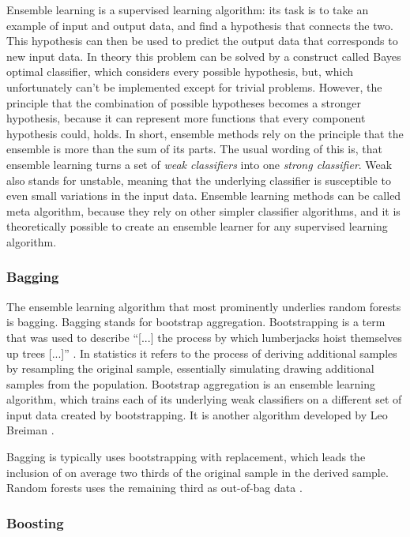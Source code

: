 \documentclass[a4paper,man,12pt,apacite]{apa6} %
\begin{document}
Ensemble learning is a supervised learning algorithm: its task is to take
an example of input and output data, and find a hypothesis that connects
the two.
This hypothesis can then be used to predict the output data that
corresponds to new input data.
In theory this problem can be solved by a construct called
Bayes optimal classifier, which considers every possible hypothesis,
but, which unfortunately can't be implemented except for trivial problems.
However, the principle that the combination of possible hypotheses becomes
a stronger hypothesis, because it can represent more functions that every
component hypothesis could, holds.
In short, ensemble methods rely on the principle that the ensemble is more
than the sum of its parts.
The usual wording of this is, that ensemble learning turns a set of
\emph{weak classifiers} into one \emph{strong classifier}.
Weak also stands for unstable, meaning that the underlying classifier is
susceptible to even small variations in the input data.
Ensemble learning methods can be called meta algorithm,
because they rely on other simpler classifier algorithms,
and it is theoretically possible to create an ensemble learner for any
supervised learning algorithm. \cite{wpEL} \cite{Polikar:2009}

\subsubsection{Bagging}

The ensemble learning algorithm that most prominently underlies
random forests is bagging. Bagging stands for bootstrap aggregation.
Bootstrapping is a term that was used to describe
“[...] the process by which lumberjacks hoist themselves up trees [...]”
\cite{wpBOOT}.
In statistics it refers to the process of deriving additional samples
by resampling the original sample,
essentially simulating drawing additional samples from the population.
Bootstrap aggregation is an ensemble learning algorithm,
which trains each of its underlying weak classifiers on a different set
of input data created by bootstrapping.
It is another algorithm developed by Leo Breiman \cite{breiman1996bagging}.

Bagging is typically uses bootstrapping with replacement,
which leads the inclusion of on average two thirds of the original sample
in the derived sample.
Random forests uses the remaining third as out-of-bag data
\cite{breiman2001random}.

\subsubsection{Boosting}
\end{document}
